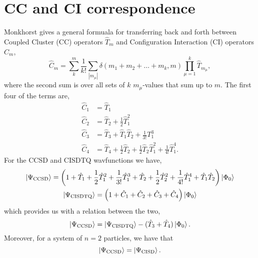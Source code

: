 \section{CC and CI correspondence}
\label{app:cc_vs_ci}

Monkhorst\cite{monkhorst1977calculation} gives a general formuala for transferring 
back and forth between Coupled Cluster (CC) operators $\hat{T}_m$ and
Configuration Interaction (CI) operators $\hat{C}_m$,
\begin{equation}
    \hat{C}_m = \sum_{k}^m\frac{1}{k!}\sum_{|m_\mu|}
        \delta(m_1 + m_2 + \dots + m_k, m) \prod_{\mu=1}^k\hat{T}_{m_\mu},
\end{equation}
where the second sum is over all sets of $k$ $m_\mu$-values that sum up to $m$.
The first four of the terms are,
\begin{align}
    \hat{C}_1 &= \hat{T}_1 \\
    \hat{C}_2 &= \hat{T}_2 + \frac{1}{2} \hat{T}_1^2 \\
    \hat{C}_3 &= \hat{T}_3 + \hat{T}_1\hat{T}_2 + \frac{1}{3!} T_1^3 \\
    \hat{C}_4 &= \hat{T}_4 + \frac{1}{2}\hat{T}_2
        + \frac{1}{2}\hat{T}_2\hat{T}_1^2 + \frac{1}{4!}\hat{T}_1^4.
\end{align}
For the CCSD and CISDTQ wavfunctions we have,
\begin{gather}
    \ket{\Psi_{\text{CCSD}}} = \left(
        1 + \hat{T}_1 + \frac{1}{2}\hat{T}_1^2 + \frac{1}{3!}\hat{T}_1^3 
        + \hat{T}_2 + \frac{1}{2}\hat{T}_2^2 + \frac{1}{4!}\hat{T}_1^4 
        + \hat{T}_1\hat{T}_2 
    \right) \ket{\Phi_0} \\
    \ket{\Psi_{\text{CISDTQ}}} = \left(
        1 + \hat{C}_1 + \hat{C}_2  + \hat{C}_3 + \hat{C}_4
    \right)\ket{\Phi_0}
\end{gather}
which provides us with a relation between the two,
\begin{equation}
    \ket{\Psi_{\text{CCSD}}} 
        = \ket{\Psi_{\text{CISDTQ}}} - (\hat{T}_3 + \hat{T}_4)\ket{\Phi_0}.
\end{equation}
Moreover, for a system of $n=2$ particles, we have that
\begin{equation}
    \ket{\Psi_{\text{CCSD}}} = \ket{\Psi_{\text{CISD}}}.
\end{equation}

